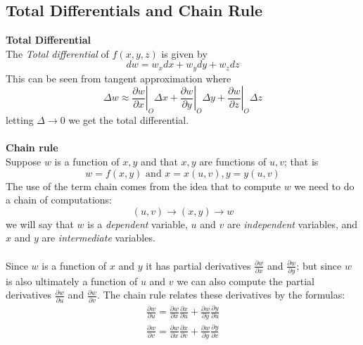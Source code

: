 \documentclass{report}
\begin{document}
\subsection{Total Differentials and Chain Rule}
\textbf{Total Differential}\\
The \textit{Total differential} of $f(x,y,z)$ is given by
\begin{equation*}
dw=w_xdx+w_ydy+w_zdz
\end{equation*}
This can be seen from tangent approximation where
\begin{equation*}
\Delta w\approx\left.\frac{\partial w}{\partial x}\right|_O\Delta x
+\left.\frac{\partial w}{\partial y}\right|_O\Delta y
+\left.\frac{\partial w}{\partial z}\right|_O\Delta z
\end{equation*}
letting $\Delta\to0$ we get the total differential.\\
\vspace{1mm}\\
\textbf{Chain rule}\\
Suppose $w$ is a function of $x,y$ and that $x,y$ are functions of $u,v$; that is
\begin{equation*}
w=f(x,y)\text{ and }x=x(u,v),y=y(u,v)
\end{equation*}
The use of the term chain comes from the idea that to compute $w$ we need to do a chain of computations:
\begin{equation*}
(u,v)\to(x,y)\to w
\end{equation*}
we will say that $w$ is a \textit{dependent} variable, $u$ and $v$ are \textit{independent} variables,
and $x$ and $y$ are \textit{intermediate} variables.\\
\vspace{1mm}\\
Since $w$ is a function of $x$ and $y$ it has partial derivatives 
$\frac{\partial w}{\partial x}$ and $\frac{\partial w}{\partial y}$; but since $w$ is also
ultimately a function of $u$ and $v$ we can also compute the partial derivatives $\frac{\partial w}{\partial u}$ 
and $\frac{\partial w}{\partial v}$. The chain rule relates these derivatives by the formulas:
\begin{align*}
\frac{\partial w}{\partial u}=\frac{\partial w}{\partial x}\frac{\partial x}{\partial u}
+\frac{\partial w}{\partial y}\frac{\partial y}{\partial u}\\
\frac{\partial w}{\partial v}=\frac{\partial w}{\partial x}\frac{\partial x}{\partial v}
+\frac{\partial w}{\partial y}\frac{\partial y}{\partial v}
\end{align*}
\end{document}
